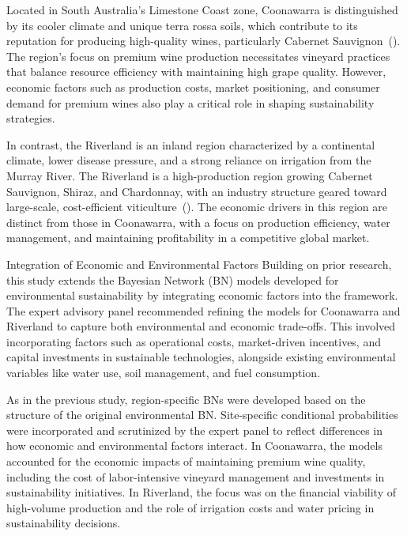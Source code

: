 \documentclass{article}
\begin{document}
Located in South Australia's Limestone Coast zone, Coonawarra is distinguished by its cooler climate and unique terra rossa soils, which contribute to its reputation for producing high-quality wines, particularly Cabernet Sauvignon~(\cite{hallidayAustralianWineEncyclopedia2009}). The region's focus on premium wine production necessitates vineyard practices that balance resource efficiency with maintaining high grape quality. However, economic factors such as production costs, market positioning, and consumer demand for premium wines also play a critical role in shaping sustainability strategies.

In contrast, the Riverland is an inland region characterized by a continental climate, lower disease pressure, and a strong reliance on irrigation from the Murray River. The Riverland is a high-production region growing Cabernet Sauvignon, Shiraz, and Chardonnay, with an industry structure geared toward large-scale, cost-efficient viticulture~(\cite{hallidayAustralianWineEncyclopedia2009}). The economic drivers in this region are distinct from those in Coonawarra, with a focus on production efficiency, water management, and maintaining profitability in a competitive global market.

Integration of Economic and Environmental Factors
Building on prior research, this study extends the Bayesian Network (BN) models developed for environmental sustainability by integrating economic factors into the framework. The expert advisory panel recommended refining the models for Coonawarra and Riverland to capture both environmental and economic trade-offs. This involved incorporating factors such as operational costs, market-driven incentives, and capital investments in sustainable technologies, alongside existing environmental variables like water use, soil management, and fuel consumption.

As in the previous study, region-specific BNs were developed based on the structure of the original environmental BN. Site-specific conditional probabilities were incorporated and scrutinized by the expert panel to reflect differences in how economic and environmental factors interact. In Coonawarra, the models accounted for the economic impacts of maintaining premium wine quality, including the cost of labor-intensive vineyard management and investments in sustainability initiatives. In Riverland, the focus was on the financial viability of high-volume production and the role of irrigation costs and water pricing in sustainability decisions.
\end{document}
